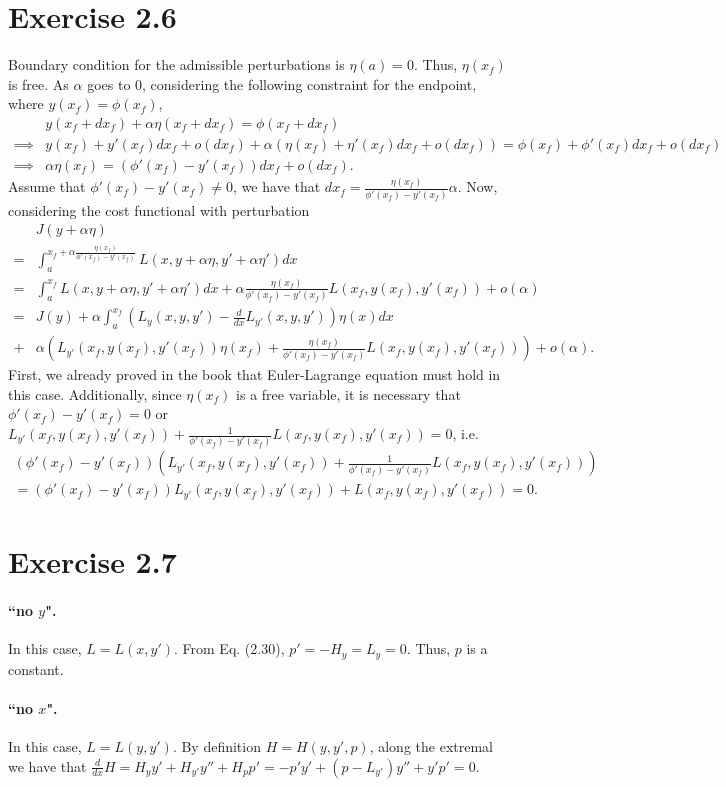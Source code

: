 \documentclass[11pt]{report}
\begin{document}
\section*{Exercise 2.6}
Boundary condition for the admissible perturbations is $\eta(a) = 0$. Thus, $\eta(x_f)$ is free. As $\alpha$ goes to $0$, considering the following constraint for the endpoint, where $y(x_f) = \phi(x_f)$,
\begin{align*}
& y(x_f + dx_f) + \alpha \eta(x_f + dx_f) = \phi(x_f + dx_f) \\ \implies & y(x_f) + y'(x_f) dx_f + o(dx_f) + \alpha (\eta(x_f) + \eta'(x_f) dx_f + o(dx_f)) = \phi(x_f) + \phi'(x_f) dx_f + o(dx_f) \\ \implies & \alpha \eta(x_f) = (\phi'(x_f) - y'(x_f)) dx_f + o(dx_f).
\end{align*}
Assume that $\phi'(x_f) - y'(x_f) \neq 0$, we have that $dx_f = \frac{\eta(x_f)}{\phi'(x_f) - y'(x_f)} \alpha$. Now, considering the cost functional with perturbation
\begin{align*}
&J(y+\alpha \eta)\\ = &\int_a^{x_f + \alpha\frac{\eta(x_f)}{\phi'(x_f) - y'(x_f)}} L(x, y+\alpha \eta, y'+\alpha \eta') dx\\ = &\int_a^{x_f} L(x, y+\alpha \eta, y'+\alpha \eta') dx + \alpha\frac{\eta(x_f)}{\phi'(x_f) - y'(x_f)}L(x_f, y(x_f), y'(x_f)) + o(\alpha)\\ = &J(y) + \alpha \int_a^{x_f} \left(L_y(x, y, y') - \frac{d}{dx}L_{y'}(x,y,y')\right)\eta(x) dx \\ + &\alpha \left(L_{y'}(x_f, y(x_f), y'(x_f))\eta(x_f) + \frac{\eta(x_f)}{\phi'(x_f) - y'(x_f)}L(x_f, y(x_f), y'(x_f))\right) + o(\alpha).
\end{align*}
First, we already proved in the book that Euler-Lagrange equation must hold in this case. Additionally, since $\eta(x_f)$ is a free variable, it is necessary that $\phi'(x_f)-y'(x_f) = 0$ or $L_{y'}(x_f, y(x_f), y'(x_f)) + \frac{1}{\phi'(x_f) - y'(x_f)}L(x_f, y(x_f), y'(x_f)) = 0$, i.e.
\begin{multline*}
(\phi'(x_f)-y'(x_f))\left(L_{y'}(x_f, y(x_f), y'(x_f)) + \frac{1}{\phi'(x_f) - y'(x_f)}L(x_f, y(x_f), y'(x_f))\right) \\= (\phi'(x_f)-y'(x_f))L_{y'}(x_f, y(x_f), y'(x_f)) + L(x_f, y(x_f), y'(x_f)) = 0.
\end{multline*}

\section*{Exercise 2.7}
\paragraph{``no $y$".} In this case, $L = L(x, y')$. From Eq. (2.30), $p' = -H_y = L_y = 0$. Thus, $p$ is a constant.
\paragraph{``no $x$".} In this case, $L = L(y, y')$. By definition $H = H(y,y',p)$, along the extremal we have that $\frac{d}{dx}H = H_y y' + H_{y'} y'' + H_p p' = -p' y' + (p - L_{y'})y'' + y'p' = 0$.
\end{document}
